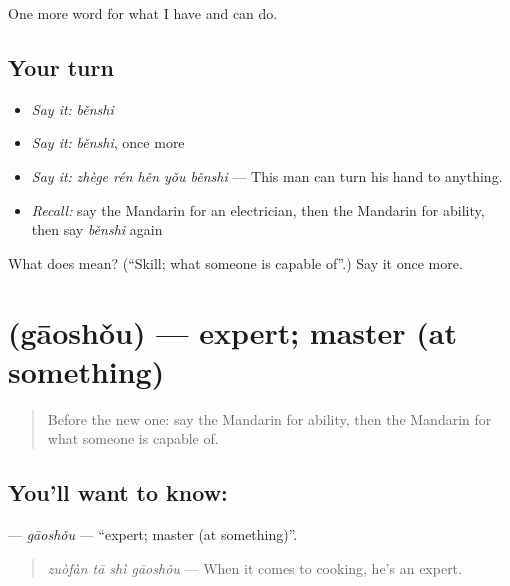 \begin{grammarlens}[title={What you've built}]
One more word for what I have and can do.
\end{grammarlens}

\subsection*{Your turn}
\begin{itemize}
\raggedright
  \item \emph{Say it:} \emph{běnshi}
  \item \emph{Say it:} \emph{běnshi}, once more
  \item \emph{Say it:} \emph{zhège rén hěn yǒu běnshi} — This man can turn his hand to anything.
  \item \emph{Recall:} say the Mandarin for an electrician, then the Mandarin for ability, then say \emph{běnshi} again
\end{itemize}

\begin{tcolorbox}[breakable,colback=teal!4,colframe=teal!35!black,title={Before you move on}]
What does  mean? (\textquotedblleft{}Skill; what someone is capable of\textquotedblright{}.) Say it once more.
\end{tcolorbox}
\section[\texorpdfstring{\zh{高手} (gāoshǒu)}{高手 (gāoshǒu)}]{ (gāoshǒu) — expert; master (at something)}

\label{lesson:ZH-C260-gaoshou}



\begin{quote}
Before the new one: say the Mandarin for ability, then the Mandarin for what someone is capable of.
\end{quote}

\subsection*{You'll want to know: }
\textbf{} — \emph{gāoshǒu} — \textquotedblleft{}expert; master (at something)\textquotedblright{}.

\begin{quote}
\textbf{} \emph{zuòfàn tā shì gāoshǒu} — When it comes to cooking, he's an expert.
\end{quote}

